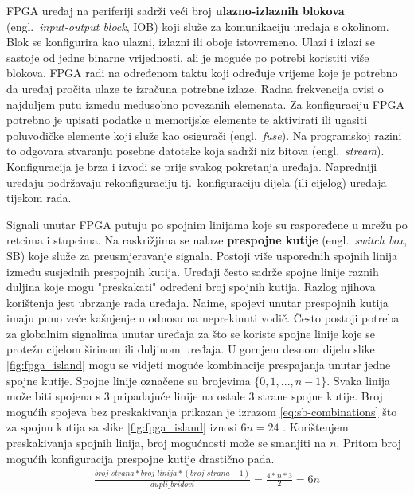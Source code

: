 \documentclass[times, utf8, diplomski]{fer}
\begin{document}
FPGA uređaj na periferiji sadrži veći broj \textbf{ulazno-izlaznih blokova} (engl.~\textit{input-output block}, IOB) koji služe za komunikaciju uređaja s okolinom. Blok se konfigurira kao ulazni, izlazni ili oboje istovremeno. Ulazi i izlazi se sastoje od jedne binarne vrijednosti, ali je moguće po potrebi koristiti više blokova. FPGA radi na određenom taktu koji određuje vrijeme koje je potrebno da uređaj pročita ulaze te izračuna potrebne izlaze. Radna frekvencija ovisi o najduljem putu izmedu medusobno povezanih elemenata. Za konfiguraciju FPGA potrebno je upisati podatke u memorijske elemente te aktivirati ili ugasiti poluvodičke elemente koji služe kao osigurači (engl.~\textit{fuse}). Na programskoj razini to odgovara stvaranju posebne datoteke koja sadrži niz bitova (engl.~\textit{stream}). Konfiguracija je brza i izvodi se prije svakog pokretanja uređaja. Napredniji uređaju podržavaju rekonfiguraciju tj.~konfiguraciju dijela (ili cijelog) uređaja tijekom rada.

Signali unutar FPGA putuju po spojnim linijama koje su raspoređene u mrežu po retcima i stupcima. Na raskrižjima se nalaze \textbf{prespojne kutije} (engl.~\textit{switch box}, SB) koje služe za preusmjeravanje signala. Postoji više usporednih spojnih linija između susjednih prespojnih kutija. Uređaji često sadrže spojne linije raznih duljina koje mogu "preskakati" određeni broj spojnih kutija. Razlog njihova korištenja jest ubrzanje rada uređaja. Naime, spojevi unutar prespojnih kutija imaju puno veće kašnjenje u odnosu na neprekinuti vodič. Često postoji potreba za globalnim signalima unutar uređaja za što se koriste spojne linije koje se protežu cijelom širinom ili duljinom uređaja. U gornjem desnom dijelu slike \ref{fig:fpga_island} mogu se vidjeti moguće kombinacije prespajanja unutar jedne spojne kutije. Spojne linije označene su brojevima $\{0, 1, ..., n-1\}$. Svaka linija može biti spojena s $3$ pripadajuće linije na ostale $3$ strane spojne kutije. Broj mogućih spojeva bez preskakivanja prikazan je izrazom \ref{eq:sb-combinations} što za spojnu kutija sa slike \ref{fig:fpga_island} iznosi $6n = 24$ \cite{article:switchBox}. Korištenjem preskakivanja spojnih linija, broj mogućnosti može se smanjiti na $n$. Pritom broj mogućih konfiguracija prespojne kutije drastično pada.
%
\begin{gather}
	\label{eq:sb-combinations}
	\frac{broj\_strana * broj\_linija * (broj\_strana - 1)}{dupli\_bridovi} = \frac{4 * n * 3}{2} = 6n
\end{gather}
\end{document}

